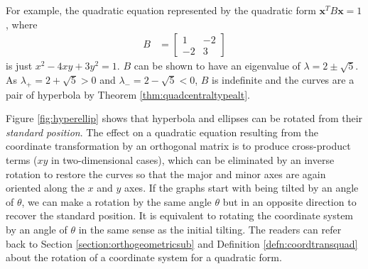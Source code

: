 For example, the quadratic equation represented by the quadratic form $\textbf{x}^TB\textbf{x} = 1$, where
\begin{align*}
B &=
\begin{bmatrix}
1 & -2 \\
-2 & 3
\end{bmatrix}
\end{align*}
is just $x^2 - 4xy + 3y^2 = 1$. $B$ can be shown to have an eigenvalue of $\lambda = 2 \pm \sqrt{5}$. As $\lambda_+ = 2 + \sqrt{5} > 0$ and $\lambda_- = 2 - \sqrt{5} < 0$, $B$ is indefinite and the curves are a pair of hyperbola by Theorem \ref{thm:quadcentraltypealt}. \par
Figure \ref{fig:hyperellip} shows that hyperbola and ellipses can be rotated from their \textit{standard position}. The effect on a quadratic equation resulting from the coordinate transformation by an orthogonal matrix is to produce cross-product terms ($xy$ in two-dimensional cases), which can be eliminated by an inverse rotation to restore the curves so that the major and minor axes are again oriented along the $x$ and $y$ axes. If the graphs start with being tilted by an angle of $\theta$, we can make a rotation by the same angle $\theta$ but in an opposite direction to recover the standard position. It is equivalent to rotating the coordinate system by an angle of $\theta$ in the same sense as the initial tilting. The readers can refer back to Section \ref{section:orthogeometricsub} and Definition \ref{defn:coordtransquad} about the rotation of a coordinate system for a quadratic form.

